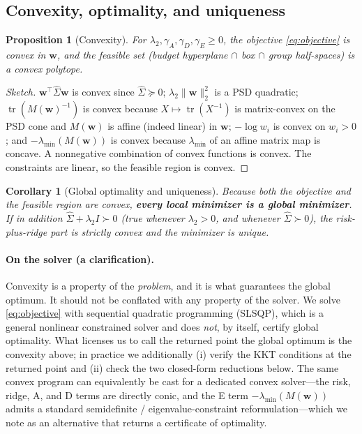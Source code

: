 \documentclass[11pt]{article}
\newcommand{\Sighat}{\hat\Sigma}
\newcommand{\tr}{\operatorname{tr}}
\newcommand{\w}{\mathbf{w}}
\newcommand{\M}{M(\w)}
\newcommand{\lammin}{\lambda_{\min}}
\newtheorem{proposition}{Proposition}
\newtheorem{corollary}{Corollary}
\begin{document}
\subsection{Convexity, optimality, and uniqueness}
\begin{proposition}[Convexity]
For $\lambda_2,\gamma_A,\gamma_D,\gamma_E\ge0$, the objective \eqref{eq:objective}
is convex in $\w$, and the feasible set (budget hyperplane $\cap$ box $\cap$ group
half-spaces) is a convex polytope.
\end{proposition}
\begin{proof}[Sketch]
$\w^\top\Sighat\w$ is convex since $\Sighat\succeq0$; $\lambda_2\lVert\w\rVert_2^2$
is a PSD quadratic; $\tr(\M^{-1})$ is convex because $X\mapsto\tr(X^{-1})$ is
matrix-convex on the PSD cone and $\M$ is affine (indeed linear) in $\w$;
$-\log w_i$ is convex on $w_i>0$; and $-\lammin(\M)$ is convex because $\lammin$ of
an affine matrix map is concave. A nonnegative combination of convex functions is
convex. The constraints are linear, so the feasible region is convex.
\end{proof}

\begin{corollary}[Global optimality and uniqueness]
Because both the objective and the feasible region are convex, \textbf{every local
minimizer is a global minimizer}. If in addition $\Sighat+\lambda_2 I\succ0$
(true whenever $\lambda_2>0$, and whenever $\Sighat\succ0$), the risk-plus-ridge
part is strictly convex and the minimizer is unique.
\end{corollary}

\paragraph{On the solver (a clarification).} Convexity is a property of the
\emph{problem}, and it is what guarantees the global optimum. It should not be
conflated with any property of the solver. We solve \eqref{eq:objective} with
sequential quadratic programming (SLSQP), which is a general nonlinear
constrained solver and does \emph{not}, by itself, certify global optimality.
What licenses us to call the returned point the global optimum is the convexity
above; in practice we additionally (i) verify the KKT conditions at the returned
point and (ii) check the two closed-form reductions below. The same convex
program can equivalently be cast for a dedicated convex solver---the risk, ridge,
A, and D terms are directly conic, and the E term $-\lammin(\M)$ admits a standard
semidefinite / eigenvalue-constraint reformulation---which we note as an
alternative that returns a certificate of optimality.
\end{document}
